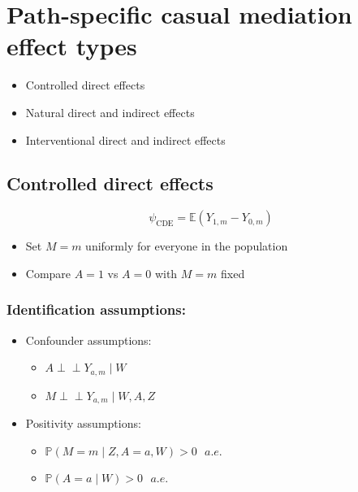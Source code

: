 \documentclass[
  12pt,
]{book}
\providecommand{\tightlist}{%
  \setlength{\itemsep}{0pt}\setlength{\parskip}{0pt}}
\theoremstyle{definition}
\theoremstyle{definition}
\theoremstyle{definition}
\newcommand{\indep}{\mbox{$\perp\!\!\!\perp$}}
\renewcommand{\P}{\mathbb{P}}
\newcommand{\E}{\mathbb{E}}
\newcommand{\1}{\mathbbm{1}}
\begin{document}
\hypertarget{estimands}{%
\chapter{Path-specific casual mediation effect types}\label{estimands}}

\begin{itemize}
\tightlist
\item
  Controlled direct effects
\item
  Natural direct and indirect effects
\item
  Interventional direct and indirect effects
\end{itemize}

\hypertarget{controlled-direct-effects}{%
\section{Controlled direct effects}\label{controlled-direct-effects}}

\[\psi_{\text{CDE}} = \E(Y_{1,m} - Y_{0,m}) \]

\begin{itemize}
\tightlist
\item
  Set \(M=m\) uniformly for everyone in the population
\item
  Compare \(A=1\) vs \(A=0\) with \(M=m\) fixed
\end{itemize}

\hypertarget{identification-assumptions}{%
\subsection{Identification assumptions:}\label{identification-assumptions}}

\begin{itemize}
\tightlist
\item
  Confounder assumptions:

  \begin{itemize}
  \tightlist
  \item
    \(A \indep Y_{a,m} \mid W\)
  \item
    \(M \indep Y_{a,m} \mid W, A, Z\)
  \end{itemize}
\item
  Positivity assumptions:

  \begin{itemize}
  \tightlist
  \item
    \(\P(M = m \mid Z, A=a, W) > 0 \text{  } a.e.\)
  \item
    \(\P(A=a \mid W) > 0 \text{  } a.e.\)
  \end{itemize}
\end{itemize}
\end{document}
